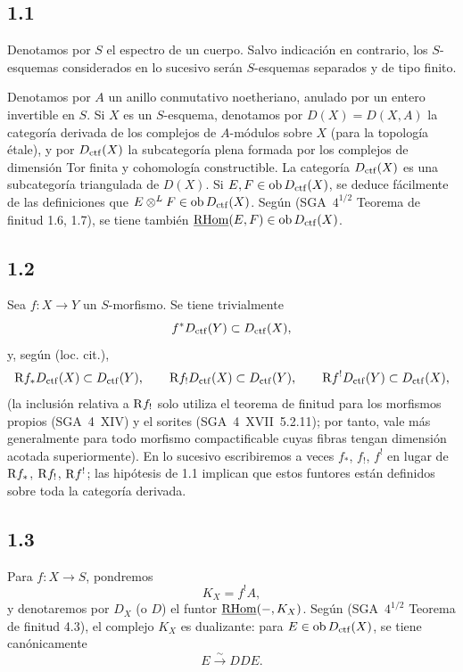 \subsection*{1.1}
Denotamos por $S$ el espectro de un cuerpo. Salvo indicación en contrario, los $S$-esquemas considerados en lo sucesivo serán $S$-esquemas separados y de tipo finito.

Denotamos por $A$ un anillo conmutativo noetheriano, anulado por un entero invertible en $S$. Si $X$ es un $S$-esquema, denotamos por $D(X)=D(X,A)$ la categoría derivada de los complejos de $A$-módulos sobre $X$ (para la topología étale), y por $D_{\mathrm{ctf}}(X)$ la subcategoría plena formada por los complejos de dimensión Tor finita y cohomología constructible. La categoría $D_{\mathrm{ctf}}(X)$ es una subcategoría triangulada de $D(X)$. Si $E,F \in \operatorname{ob} D_{\mathrm{ctf}}(X)$, se deduce fácilmente de las definiciones que $E \otimes^{L} F \in \operatorname{ob} D_{\mathrm{ctf}}(X)$. Según (SGA~$4^{1/2}$ Teorema de finitud 1.6, 1.7), se tiene también $\underline{\mathrm{RHom}}(E,F) \in \operatorname{ob} D_{\mathrm{ctf}}(X)$.

\subsection*{1.2}
Sea $f:X\to Y$ un $S$-morfismo. Se tiene trivialmente
\[
f^{*}D_{\mathrm{ctf}}(Y) \subset D_{\mathrm{ctf}}(X),
\]
y, según (loc. cit.),
\[
\mathrm{R} f_{*}D_{\mathrm{ctf}}(X) \subset D_{\mathrm{ctf}}(Y),\qquad
\mathrm{R} f_{!}D_{\mathrm{ctf}}(X) \subset D_{\mathrm{ctf}}(Y),\qquad
\mathrm{R} f^{!}D_{\mathrm{ctf}}(Y) \subset D_{\mathrm{ctf}}(X),
\]
(la inclusión relativa a $\mathrm{R} f_{!}$ solo utiliza el teorema de finitud para los morfismos propios (SGA~4~XIV) y el sorites (SGA~4~XVII~5.2.11); por tanto, vale más generalmente para todo morfismo compactificable cuyas fibras tengan dimensión acotada superiormente). En lo sucesivo escribiremos a veces $f_{*}$, $f_{!}$, $f^{!}$ en lugar de $\mathrm{R} f_{*}$, $\mathrm{R} f_{!}$, $\mathrm{R} f^{!}$; las hipótesis de 1.1 implican que estos funtores están definidos sobre toda la categoría derivada.

\subsection*{1.3}
Para $f:X\to S$, pondremos
\[
K_X=f^{!}A,
\]
y denotaremos por $D_X$ (o $D$) el funtor $\underline{\mathrm{RHom}}(-,K_X)$. Según (SGA~$4^{1/2}$ Teorema de finitud 4.3), el complejo $K_X$ es dualizante: para $E\in\operatorname{ob} D_{\mathrm{ctf}}(X)$, se tiene canónicamente
\[
E \xrightarrow{\sim} DDE.
\]

